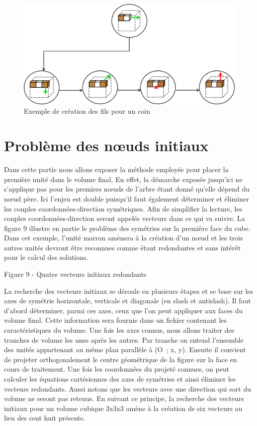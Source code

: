 \begin{figure}[h]
 \centering
 \includegraphics[scale=0.5,keepaspectratio=true]{img/buildCornerChildren.png}
 \caption{Exemple de création des fils pour un coin}
 \label{buildCornerChildren}
\end{figure}

\clearpage
\section{Problème des nœuds initiaux}
Dans cette partie nous allons exposer la méthode employée pour 	placer la première unité dans le volume final. En effet, la démarche exposée jusqu’ici ne s’applique pas pour les premiers nœuds de l’arbre étant donné qu’elle dépend du nœud père. Ici l’enjeu est double puisqu’il faut également déterminer et éliminer les couples coordonnées-direction symétriques. Afin de simplifier la lecture, les couples coordonnées-direction seront appelés vecteurs dans ce qui va suivre. La figure 9 illustre en partie le problème des symétries sur la première face du cube. Dans cet exemple, l’unité marron amènera à la création d’un nœud et les trois autres unités devront être reconnues comme étant redondantes et sans intérêt pour le calcul des solutions. 


Figure 9 - Quatre vecteurs initiaux redondants


La recherche des vecteurs initiaux se déroule en plusieurs étapes et se base sur les axes de symétrie horizontale, verticale et diagonale (en slash et antislash). Il faut d’abord déterminer, parmi ces axes, ceux que l’on peut appliquer aux faces du volume final. Cette information sera fournie dans un fichier contenant les caractéristiques du volume. Une fois les axes connus, nous allons traiter des tranches de volume les unes après les autres. Par tranche on entend l’ensemble des unités appartenant au même plan parallèle à (O ; x, y). Ensuite il convient de projeter orthogonalement le centre géométrique de la figure sur la face en cours de traitement. Une fois les coordonnées du projeté connues, on peut calculer les équations cartésiennes des axes de symétries et ainsi éliminer les vecteurs redondants. Aussi notons que les vecteurs avec une direction qui sort du volume ne seront pas retenus. En suivant ce principe, la recherche des vecteurs initiaux pour un volume cubique 3x3x3 amène à la création de six vecteurs au lieu des cent huit présents.